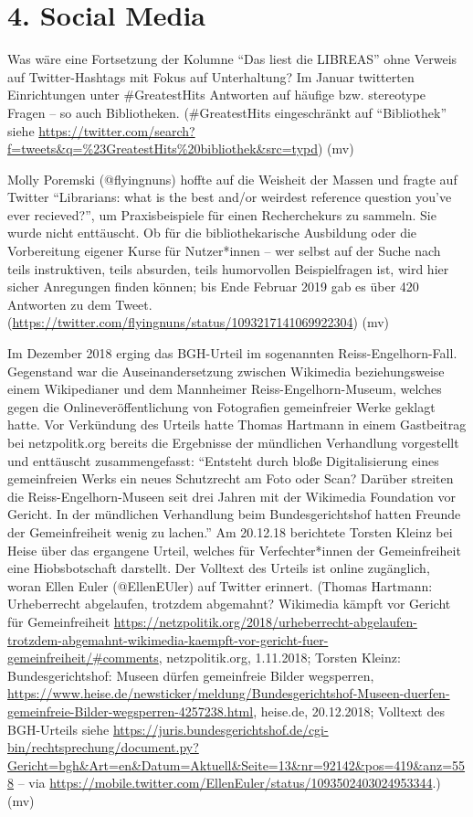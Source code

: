 \documentclass[a4paper,
fontsize=11pt,
oneside,
numbers=noperiodatend,
parskip=half-,
bibliography=totoc,
final
]{scrartcl}
\begin{document}
\hypertarget{social-media}{%
\section*{4. Social Media}\label{social-media}}

Was wäre eine Fortsetzung der Kolumne \enquote{Das liest die LIBREAS}
ohne Verweis auf Twitter-Hashtags mit Fokus auf Unterhaltung? Im Januar
twitterten Einrichtungen unter \#GreatestHits Antworten auf häufige bzw.
stereotype Fragen -- so auch Bibliotheken. (\#GreatestHits eingeschränkt
auf \enquote{Bibliothek} siehe
\url{https://twitter.com/search?f=tweets\&q=\%23GreatestHits\%20bibliothek\&src=typd})
(mv)

Molly Poremski (@flyingnuns) hoffte auf die Weisheit der Massen und
fragte auf Twitter \enquote{Librarians: what is the best and/or weirdest
reference question you've ever recieved?}, um Praxisbeispiele für einen
Recherchekurs zu sammeln. Sie wurde nicht enttäuscht. Ob für die
bibliothekarische Ausbildung oder die Vorbereitung eigener Kurse für
Nutzer*innen -- wer selbst auf der Suche nach teils instruktiven, teils
absurden, teils humorvollen Beispielfragen ist, wird hier sicher
Anregungen finden können; bis Ende Februar 2019 gab es über 420
Antworten zu dem Tweet.
(\url{https://twitter.com/flyingnuns/status/1093217141069922304}) (mv)

Im Dezember 2018 erging das BGH-Urteil im sogenannten
Reiss-Engelhorn-Fall. Gegenstand war die Auseinandersetzung zwischen
Wikimedia beziehungsweise einem Wikipedianer und dem Mannheimer
Reiss-Engelhorn-Museum, welches gegen die Onlineveröffentlichung von
Fotografien gemeinfreier Werke geklagt hatte. Vor Verkündung des Urteils
hatte Thomas Hartmann in einem Gastbeitrag bei netzpolitk.org bereits
die Ergebnisse der mündlichen Verhandlung vorgestellt und enttäuscht
zusammengefasst: \enquote{Entsteht durch bloße Digitalisierung eines
gemeinfreien Werks ein neues Schutzrecht am Foto oder Scan? Darüber
streiten die Reiss-Engelhorn-Museen seit drei Jahren mit der Wikimedia
Foundation vor Gericht. In der mündlichen Verhandlung beim
Bundesgerichtshof hatten Freunde der Gemeinfreiheit wenig zu lachen.} Am
20.12.18 berichtete Torsten Kleinz bei Heise über das ergangene Urteil,
welches für Verfechter*innen der Gemeinfreiheit eine Hiobsbotschaft
darstellt. Der Volltext des Urteils ist online zugänglich, woran Ellen
Euler (@EllenEUler) auf Twitter erinnert. (Thomas Hartmann: Urheberrecht
abgelaufen, trotzdem abgemahnt? Wikimedia kämpft vor Gericht für
Gemeinfreiheit
\url{https://netzpolitik.org/2018/urheberrecht-abgelaufen-trotzdem-abgemahnt-wikimedia-kaempft-vor-gericht-fuer-gemeinfreiheit/\#comments},
netzpolitik.org, 1.11.2018; Torsten Kleinz: Bundesgerichtshof: Museen
dürfen gemeinfreie Bilder wegsperren,
\url{https://www.heise.de/newsticker/meldung/Bundesgerichtshof-Museen-duerfen-gemeinfreie-Bilder-wegsperren-4257238.html},
heise.de, 20.12.2018; Volltext des BGH-Urteils siehe
\url{https://juris.bundesgerichtshof.de/cgi-bin/rechtsprechung/document.py?Gericht=bgh\&Art=en\&Datum=Aktuell\&Seite=13\&nr=92142\&pos=419\&anz=558}
-- via
\url{https://mobile.twitter.com/EllenEuler/status/1093502403024953344}.)
(mv)
\end{document}
